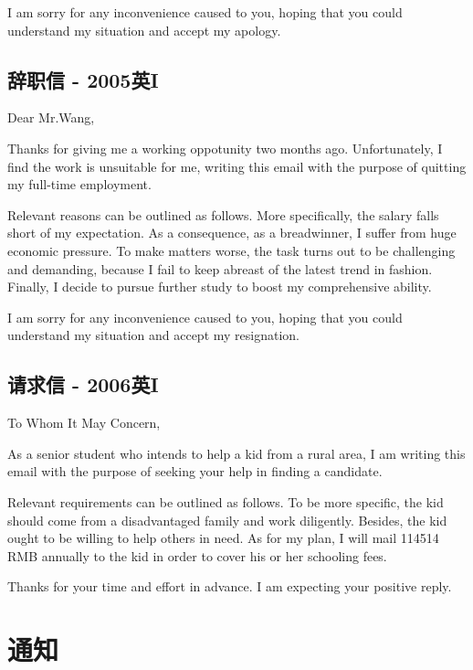 I am sorry for any inconvenience caused to you, hoping that you could understand my 
situation and accept my apology.

\YSLM

\section{辞职信 - 2005英I}

\noindent Dear Mr.Wang,

Thanks for giving me a working oppotunity two months ago. Unfortunately, 
I find the work is unsuitable for me, writing this email with the purpose of 
quitting my full-time employment.

Relevant reasons can be outlined as follows. More specifically, the salary falls short of my
expectation. As a consequence, as a breadwinner, I suffer from huge economic pressure. To make
matters worse, the task turns out to be challenging and demanding, because I fail to keep 
abreast of the latest trend in fashion. Finally, I decide to pursue further study to boost my 
comprehensive ability. 

I am sorry for any inconvenience caused to you, hoping that you could understand my 
situation and accept my resignation.

\YSLM

\section{请求信 - 2006英I}

\noindent To Whom It May Concern,

As a senior student who intends to help a kid from a rural area, I am 
writing this email with the purpose of seeking your help in 
finding a candidate. 

Relevant requirements can be outlined as follows. To be more specific, the kid should 
come from a disadvantaged family and work diligently. 
Besides, the kid ought to be willing to help others in need.
As for my plan, I will mail 114514 RMB annually to the kid in order to cover 
his or her schooling fees. 

Thanks for your time and effort in advance. I am expecting your positive reply. 

\YSLM

\chapter{通知}

